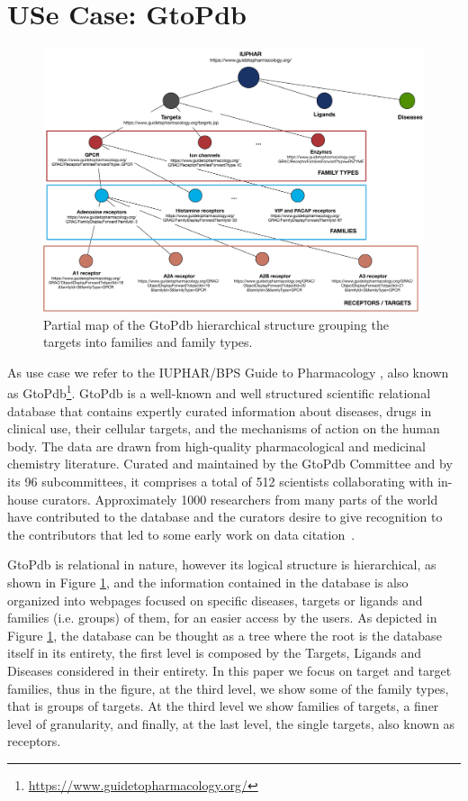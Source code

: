 \section{USe Case: GtoPdb}
\label{section:use_case}

\begin{figure}[]
\centering
  \includegraphics[width=.9\textwidth]{figures/iuphar_schema}
  \caption{Partial map of the GtoPdb hierarchical structure grouping the targets into families and family types.}
  \label{figure:iuphar_schema}
\end{figure}

As use case we refer to the IUPHAR/BPS Guide to Pharmacology \citep{iuphar2018}, also known as GtoPdb\footnote{\url{https://www.guidetopharmacology.org/}}.
GtoPdb is a well-known and well structured scientific relational database that contains expertly curated information about diseases, drugs in clinical use, their cellular targets, and the mechanisms of action on the human body. The data are drawn from high-quality pharmacological and medicinal chemistry literature. 
Curated and maintained by the GtoPdb Committee and by its 96 subcommittees, it comprises a total of 512 scientists collaborating with in-house curators. 
Approximately 1000 researchers from many parts of the world have contributed to the database and the curators desire to give recognition to the contributors that led to some early work on data citation~\citep{buneman2006cite}.  

GtoPdb is relational in nature, however its logical structure is hierarchical, as shown in Figure \ref{figure:iuphar_schema}, and the information contained in the database is also organized into webpages focused on specific diseases, targets or ligands and families (i.e. groups) of them, for an easier access by the users. 
As depicted in Figure \ref{figure:iuphar_schema}, the database can be thought as a tree where the root is the database itself in its entirety, the first level is composed by the Targets, Ligands and Diseases considered in their entirety. 
In this paper we focus on target and target families, thus in the figure, at the third level, we show some of the family types, that is groups of targets. At the third level we show families of targets, a finer level of granularity, and finally, at the last level, the single targets, also known as receptors. 

